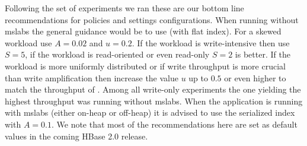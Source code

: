  Following the set of experiments we ran these are our bottom line recommendations for policies and settings configurations.
When running without mslabs the general guidance would be to use \adp (with flat index). For a skewed workload use $A=0.02$ and $u=0.2$. If the workload is write-intensive then use $S=5$, if the workload is read-oriented or even read-only $S=2$ is better. If the workload is more uniformly distributed or if write throughput is more crucial than write amplification then increase the value $u$ up to $0.5$ or even higher to match the throughput of \basic. 
Among all write-only experiments the one yielding the highest throughput was running without mslabs.
When the application is running with mslabs (either on-heap or off-heap) it is advised to use the serialized index with $A=0.1$. We note that most of the recommendations here are set as default values in the coming HBase 2.0 release.
